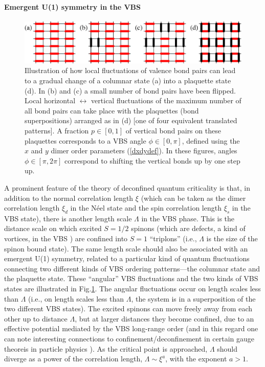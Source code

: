 \documentclass[draft,numberedheadings]{aipproc}
\begin{document}
\paragraph{Emergent U(1) symmetry in the VBS}

\begin{figure}
\includegraphics[width=13cm, clip]{vbsfluct.eps}
\caption{Illustration of how local fluctuations of valence bond pairs can lead to a gradual change of a columnar state (a) into a plaquette 
state (d). In (b) and (c) a small number of bond pairs have been flipped. Local horizontal $\leftrightarrow$ vertical fluctuations of the 
maximum number of all bond pairs can take place with the plaquettes (bond superpositions) arranged as in (d) [one of four equivalent translated
patterns]. A fraction $p \in [0,1]$ of vertical bond pairs on these plaquettes corresponds to a VBS angle $\phi \in [0,\pi]$, defined using
the $x$ and $y$ dimer order parameters (\ref{dxdydef}). In these figures, angles $\phi \in [\pi,2\pi]$ correspond to shifting the vertical
bonds up by one step up.}
\label{vbsfluct}
\end{figure}

A prominent feature of the theory of deconfined quantum criticality is that, in addition to the normal correlation length $\xi$ (which can be taken
as the dimer correlation length $\xi_d$ in the N\'eel state and the spin correlation length $\xi_s$ in the VBS state), there is another length 
scale $\Lambda$ in the VBS phase. This is the distance scale on which excited $S=1/2$ spinons (which are defects, a kind of vortices, in the VBS 
\cite{levin04}) are confined into $S=1$ ``triplons'' (i.e., $\Lambda$ is the size of the spinon bound state). The same length scale should also 
be associated with an emergent U(1) symmetry, related to a particular kind of quantum fluctuations connecting two different kinds of VBS ordering
patterns---the columnar state and the plaquette state. These ``angular'' VBS fluctuations and the two kinds of VBS states are illustrated in
Fig.\ref{vbsfluct}. The angular fluctuations occur on length scales less than $\Lambda$ (i.e., on length scales less than $\Lambda$, the system is in
a superposition of the two different VBS states). The excited spinons can move freely away from each other up to distance $\Lambda$, but at
larger distances they become confined, due to an effective potential mediated by the VBS long-range order (and in this regard one can note
interesting connections to confinement/deconfinement in certain gauge theoreis in particle physics \cite{sachdev3}). As the critical point is 
approached, $\Lambda$ should diverge as a power of the correlation length, $\Lambda \sim \xi^a$, with the exponent $a>1$. 
\end{document}
